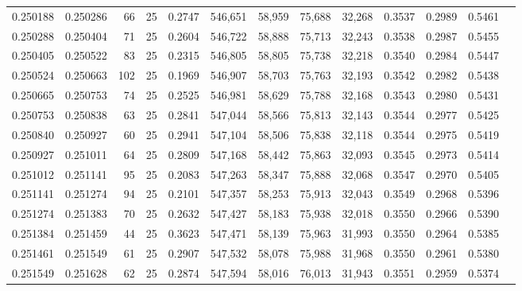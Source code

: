 \begin{tabular}{rrrrrrrrrrrrr}
0.250188 & 0.250286 &    66 &  25 &                                     0.2747 & 546,651 &  58,959 &  75,688 &  32,268 & 0.3537 & 0.2989 & 0.5461 \\
0.250288 & 0.250404 &    71 &  25 &                                     0.2604 & 546,722 &  58,888 &  75,713 &  32,243 & 0.3538 & 0.2987 & 0.5455 \\
0.250405 & 0.250522 &    83 &  25 &                                     0.2315 & 546,805 &  58,805 &  75,738 &  32,218 & 0.3540 & 0.2984 & 0.5447 \\
0.250524 & 0.250663 &   102 &  25 &                                     0.1969 & 546,907 &  58,703 &  75,763 &  32,193 & 0.3542 & 0.2982 & 0.5438 \\
0.250665 & 0.250753 &    74 &  25 &                                     0.2525 & 546,981 &  58,629 &  75,788 &  32,168 & 0.3543 & 0.2980 & 0.5431 \\
0.250753 & 0.250838 &    63 &  25 &                                     0.2841 & 547,044 &  58,566 &  75,813 &  32,143 & 0.3544 & 0.2977 & 0.5425 \\
0.250840 & 0.250927 &    60 &  25 &                                     0.2941 & 547,104 &  58,506 &  75,838 &  32,118 & 0.3544 & 0.2975 & 0.5419 \\
0.250927 & 0.251011 &    64 &  25 &                                     0.2809 & 547,168 &  58,442 &  75,863 &  32,093 & 0.3545 & 0.2973 & 0.5414 \\
0.251012 & 0.251141 &    95 &  25 &                                     0.2083 & 547,263 &  58,347 &  75,888 &  32,068 & 0.3547 & 0.2970 & 0.5405 \\
0.251141 & 0.251274 &    94 &  25 &                                     0.2101 & 547,357 &  58,253 &  75,913 &  32,043 & 0.3549 & 0.2968 & 0.5396 \\
0.251274 & 0.251383 &    70 &  25 &                                     0.2632 & 547,427 &  58,183 &  75,938 &  32,018 & 0.3550 & 0.2966 & 0.5390 \\
0.251384 & 0.251459 &    44 &  25 &                                     0.3623 & 547,471 &  58,139 &  75,963 &  31,993 & 0.3550 & 0.2964 & 0.5385 \\
0.251461 & 0.251549 &    61 &  25 &                                     0.2907 & 547,532 &  58,078 &  75,988 &  31,968 & 0.3550 & 0.2961 & 0.5380 \\
0.251549 & 0.251628 &    62 &  25 &                                     0.2874 & 547,594 &  58,016 &  76,013 &  31,943 & 0.3551 & 0.2959 & 0.5374 \\

\end{tabular}
